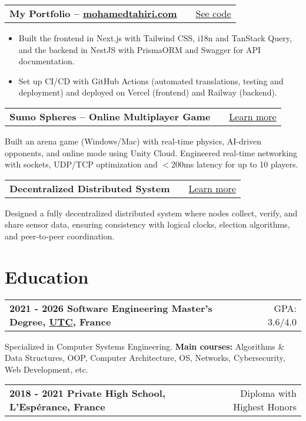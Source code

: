 \documentclass[a4paper,10pt]{article}
\makeatletter
\newenvironment{jobshort}[2]
    {
    \begin{tabularx}{\linewidth}{@{}l X r@{}}
    \textbf{#1} & \hfill &  #2 \\[3.75pt]
    \end{tabularx}
    } {}
\newenvironment{joblong}[2]
    {
    \begin{tabularx}{\linewidth}{@{}l X r@{}}
    \textbf{#1} & \hfill &  #2 \\[3.75pt]
    \end{tabularx}
    \begin{minipage}[t]{\linewidth}
    \begin{itemize}[nosep,after=\strut, leftmargin=1em, itemsep=3pt,label=--]
    }
    {
    \end{itemize}
    \end{minipage}    
    }
\makeatother
\begin{document}
\begin{joblong}{My Portfolio – \href{https://mohamedtahiri.com}{mohamedtahiri.com}}{\href{https://github.com/moha-tah/portfolio}{See code}}
    \item Built the frontend in Next.js with Tailwind CSS, i18n and TanStack Query, and the backend in NestJS with PrismaORM and Swagger for API documentation.
    \item Set up CI/CD with GitHub Actions (automated translations, testing and deployment) and deployed on Vercel (frontend) and Railway (backend).
\end{joblong}

\begin{jobshort}{Sumo Spheres – Online Multiplayer Game}{\href{https://mohamedtahiri.com/projects/online-multiplayer-game}{Learn more}}
    Built an arena game (Windows/Mac) with real-time physics, AI-driven opponents, and online mode using Unity Cloud. Engineered real-time networking with sockets, UDP/TCP optimization and $<$200ms latency for up to 10 players.
\end{jobshort}

\begin{jobshort}{Decentralized Distributed System}{\href{https://mohamedtahiri.com/projects/decentralized-distributed-system}{Learn more}}
    Designed a fully decentralized distributed system where nodes collect, verify, and share sensor data, ensuring consistency with logical clocks, election algorithms, and peer-to-peer coordination.
\end{jobshort}

\section{Education}

\begin{jobshort}{2021 - 2026    Software Engineering Master's Degree, \href{https://www.utc.fr}{UTC}, France}{GPA: 3.6/4.0}
    Specialized in Computer Systems Engineering. \textbf{Main courses:} Algorithms \& Data Structures, OOP, Computer Architecture, OS, Networks, Cybersecurity, Web Development, etc.
\end{jobshort}

\begin{jobshort}{2018 - 2021    Private High School, L'Espérance, France}{Diploma with Highest Honors}
\end{jobshort}
\end{document}
